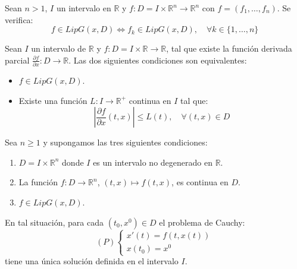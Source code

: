 \begin{proposition}
    Sean $n > 1$, $I$ un intervalo en $\mathbb{R}$ y $f: D = I \times \mathbb{R}^n \to \mathbb{R}^n$ con $f = (f_1, \dots, f_n)$.
    Se verifica:
    $$f \in LipG(x, D) \Leftrightarrow f_k \in LipG(x, D), \quad \forall k \in \{1, \dots, n\}$$
\end{proposition}

\begin{proposition}
    Sean $I$ un intervalo de $\mathbb{R}$ y $f: D = I \times \mathbb{R} \to \mathbb{R}$, tal que existe la función derivada parcial $\frac{\partial f}{\partial x}: D \to \mathbb{R}$.
    Las dos siguientes condiciones son equivalentes:
    \begin{itemize}
        \item $f \in LipG(x, D)$.
        \item Existe una función $L: I \to \mathbb{R}^+$ continua en $I$ tal que:
              $$|\frac{\partial f}{\partial x}(t, x)| \leq L(t), \quad \forall (t, x) \in D$$
    \end{itemize}
\end{proposition}

\begin{theorem}
    Sea $n \geq 1$ y supongamos las tres siguientes condiciones:
    \begin{enumerate}
        \item $D = I \times \mathbb{R}^n$ donde $I$ es un intervalo no degenerado en $\mathbb{R}$.
        \item La función $f: D \to \mathbb{R}^n$, $(t, x) \mapsto f(t, x)$, es continua en $D$.
        \item $f \in LipG(x, D)$.
    \end{enumerate}
    En tal situación, para cada $(t_0, x^0) \in D$ el problema de Cauchy:
    $$(P) \begin{cases}
            x'(t) = f(t, x(t)) \\
            x(t_0) = x^0
        \end{cases}$$
    tiene una única solución definida en el intervalo $I$.
\end{theorem}